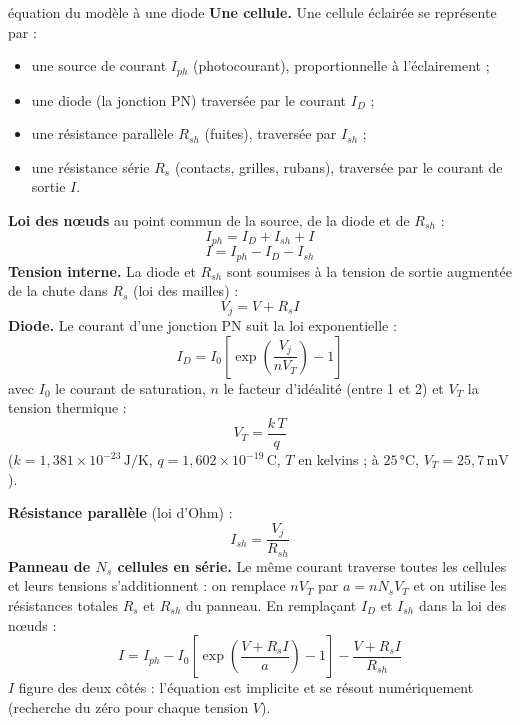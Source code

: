 \documentclass[11pt,a4paper]{article}
\newcommand{\U}[1]{\,\mathrm{#1}}
\begin{document}
\begin{demo}{équation du modèle à une diode}
\textbf{Une cellule.} Une cellule éclairée se représente par :
\begin{itemize}[nosep]
\item une source de courant $I_{ph}$ (photocourant), proportionnelle à l'éclairement ;
\item une diode (la jonction PN) traversée par le courant $I_D$ ;
\item une résistance parallèle $R_{sh}$ (fuites), traversée par $I_{sh}$ ;
\item une résistance série $R_s$ (contacts, grilles, rubans), traversée par le courant de sortie $I$.
\end{itemize}
\textbf{Loi des nœuds} au point commun de la source, de la diode et de $R_{sh}$ :
\[
I_{ph} = I_D + I_{sh} + I
\]
\[
I = I_{ph} - I_D - I_{sh}
\]
\textbf{Tension interne.} La diode et $R_{sh}$ sont soumises à la tension de sortie augmentée de la chute dans $R_s$ (loi des mailles) :
\[
V_j = V + R_s I
\]
\textbf{Diode.} Le courant d'une jonction PN suit la loi exponentielle :
\[
I_D = I_0 \left[ \exp\!\left( \frac{V_j}{n V_T} \right) - 1 \right]
\]
avec $I_0$ le courant de saturation, $n$ le facteur d'idéalité (entre 1 et 2) et $V_T$ la tension thermique :
\[
V_T = \frac{k \, T}{q}
\]
($k = 1{,}381 \times 10^{-23}\U{J/K}$, $q = 1{,}602 \times 10^{-19}\U{C}$, $T$ en kelvins ; à $25\U{°C}$, $V_T = 25{,}7\U{mV}$).

\textbf{Résistance parallèle} (loi d'Ohm) :
\[
I_{sh} = \frac{V_j}{R_{sh}}
\]
\textbf{Panneau de $N_s$ cellules en série.} Le même courant traverse toutes les cellules et leurs tensions s'additionnent : on remplace $n V_T$ par $a = n N_s V_T$ et on utilise les résistances totales $R_s$ et $R_{sh}$ du panneau. En remplaçant $I_D$ et $I_{sh}$ dans la loi des nœuds :
\[
I = I_{ph} - I_0 \left[ \exp\!\left( \frac{V + R_s I}{a} \right) - 1 \right] - \frac{V + R_s I}{R_{sh}}
\]
$I$ figure des deux côtés : l'équation est implicite et se résout numériquement (recherche du zéro pour chaque tension $V$).
\end{demo}
\end{document}
